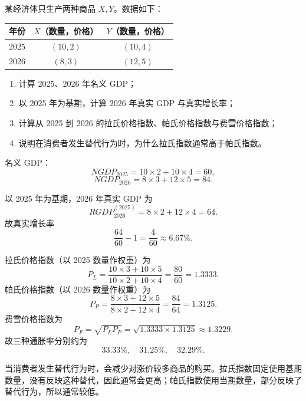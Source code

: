 \begin{question}
某经济体只生产两种商品 $X,Y$。数据如下：

\begin{center}
\begin{tabular}{c|cc}
年份 & $X$（数量，价格） & $Y$（数量，价格）\\ \hline
2025 & $(10,2)$ & $(10,4)$\\
2026 & $(8,3)$ & $(12,5)$
\end{tabular}
\end{center}

\begin{enumerate}[label=(\arabic*),leftmargin=2.5em]
  \item 计算 2025、2026 年名义 GDP；
  \item 以 2025 年为基期，计算 2026 年真实 GDP 与真实增长率；
  \item 计算从 2025 到 2026 的拉氏价格指数、帕氏价格指数与费雪价格指数；
  \item 说明在消费者发生替代行为时，为什么拉氏指数通常高于帕氏指数。
\end{enumerate}

\begin{solution}
名义 GDP：
\[
NGDP_{2025}=10\times 2+10\times 4=60,
\]
\[
NGDP_{2026}=8\times 3+12\times 5=84.
\]

以 2025 年为基期，2026 年真实 GDP 为
\[
RGDP_{2026}^{(2025)}=8\times 2+12\times 4=64.
\]
故真实增长率
\[
\frac{64}{60}-1=\frac{4}{60}\approx 6.67\%.
\]

拉氏价格指数（以 2025 数量作权重）为
\[
P_L=\frac{10\times 3+10\times 5}{10\times 2+10\times 4}
=\frac{80}{60}=1.3333.
\]
帕氏价格指数（以 2026 数量作权重）为
\[
P_P=\frac{8\times 3+12\times 5}{8\times 2+12\times 4}
=\frac{84}{64}=1.3125.
\]
费雪价格指数为
\[
P_F=\sqrt{P_LP_P}
=\sqrt{1.3333\times 1.3125}\approx 1.3229.
\]
故三种通胀率分别约为
\[
33.33\%,\quad 31.25\%,\quad 32.29\%.
\]

当消费者发生替代行为时，会减少对涨价较多商品的购买。拉氏指数固定使用基期数量，没有反映这种替代，因此通常会更高；帕氏指数使用当期数量，部分反映了替代行为，所以通常较低。
\end{solution}
\end{question}

